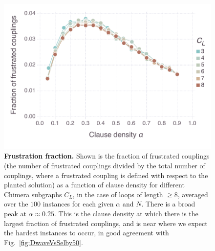 \begin{figure}[t]
\begin{center}
\includegraphics[width=\columnwidth]{chapters/Planted/frustrationRatio}
\caption{\textbf{Frustration fraction.} Shown is the fraction of frustrated couplings (the number of frustrated couplings divided by the total number of couplings, where a frustrated coupling is defined with respect to the planted solution) as a function of clause density for different Chimera subgraphs $C_L$, in the case of  loops of length $\geq 8$, averaged over the $100$ instances for each given $\alpha$ and $N$. There is a broad peak at $\alpha \approx 0.25$. This is the clause density at which there is the largest fraction of frustrated couplings, and is near where we expect the hardest instances to occur, in good agreement with Fig.~\ref{fig:DwaveVsSelby50}.
}
\label{fig:frustRat}
\end{center}
\end{figure}

